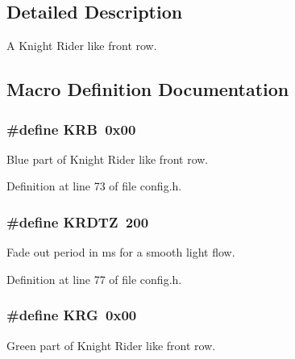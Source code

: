 \subsection{Detailed Description}
A Knight Rider like front row. 



\subsection{Macro Definition Documentation}
\subsubsection[{\texorpdfstring{K\+RB}{KRB}}]{\setlength{\rightskip}{0pt plus 5cm}\#define K\+RB~0x00}\hypertarget{group__knightrider_gaa315fefb5665924b7d512104bc3965cd}{}\label{group__knightrider_gaa315fefb5665924b7d512104bc3965cd}


Blue part of Knight Rider like front row. 



Definition at line 73 of file config.\+h.

\subsubsection[{\texorpdfstring{K\+R\+D\+TZ}{KRDTZ}}]{\setlength{\rightskip}{0pt plus 5cm}\#define K\+R\+D\+TZ~200}\hypertarget{group__knightrider_ga64a0c208656bb11ad944489886089b7e}{}\label{group__knightrider_ga64a0c208656bb11ad944489886089b7e}


Fade out period in ms for a smooth light flow. 



Definition at line 77 of file config.\+h.

\subsubsection[{\texorpdfstring{K\+RG}{KRG}}]{\setlength{\rightskip}{0pt plus 5cm}\#define K\+RG~0x00}\hypertarget{group__knightrider_ga47a5cb8daecea854270c0d09c3ebc24c}{}\label{group__knightrider_ga47a5cb8daecea854270c0d09c3ebc24c}


Green part of Knight Rider like front row. 



